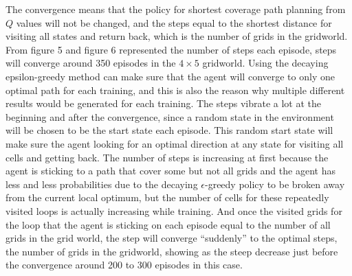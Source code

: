 \documentclass{article}
\begin{document}
The convergence means that the policy for shortest coverage path planning from $Q$ values will not be changed, and the steps equal to the shortest distance for visiting all states and return back, which is the number of grids in the gridworld. From figure 5 and figure 6 represented the number of steps each episode, steps will converge around 350 episodes in the $4\times5$ gridworld. Using the decaying epsilon-greedy method can make sure that the agent will converge to only one optimal path for each training, and this is also the reason why multiple different results would be generated for each training. The steps vibrate a lot at the beginning and after the convergence, since a random state in the environment will be chosen to be the start state each episode. This random start state will make sure the agent looking for an optimal direction at any state for visiting all cells and getting back. The number of steps is increasing at first because the agent is sticking to a path that cover some but not all grids and the agent has less and less probabilities due to the decaying $\epsilon$-greedy policy to be broken away from the current local optimum, but the number of cells for these repeatedly visited loops is actually increasing while training. And once the visited grids for the loop that the agent is sticking on each episode equal to the number of all grids in the grid world, the step will converge “suddenly” to the optimal steps, the number of grids in the gridworld, showing as the steep decrease just before the convergence around 200 to 300 episodes in this case. 
\end{document}
